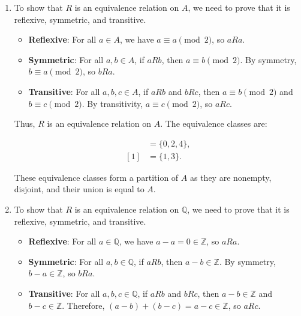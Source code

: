 \begin{enumerate}
\begin{align*}
[0] &= \{n \in \mathbb{Z} \mid n \equiv 0 \pmod 7\} = \{\dots, -7, 0, 7, 14, \dots\}, \\
[1] &= \{n \in \mathbb{Z} \mid n \equiv 1, 2, \text{ or } 4 \pmod 7\} = \{\dots, -6, -5, -3, 1, 2, 4, 8, 9, 11, \dots\}, \\
[3] &= \{n \in \mathbb{Z} \mid n \equiv 3, 5, \text{ or } 6 \pmod 7\} = \{\dots, -4, -2, -1, 3, 5, 6, 10, 12, 13, \dots\}.
\end{align*}

\item
To show that $R$ is an equivalence relation on $A$, we need to prove that it is reflexive, symmetric, and transitive.

\begin{itemize}
\item \textbf{Reflexive}: For all $a \in A$, we have $a \equiv a \pmod{2}$, so $aRa$.
\item \textbf{Symmetric}: For all $a, b \in A$, if $aRb$, then $a \equiv b \pmod{2}$. By symmetry, $b \equiv a \pmod{2}$, so $bRa$.
\item \textbf{Transitive}: For all $a, b, c \in A$, if $aRb$ and $bRc$, then $a \equiv b \pmod{2}$ and $b \equiv c \pmod{2}$. By transitivity, $a \equiv c \pmod{2}$, so $aRc$.
\end{itemize}

Thus, $R$ is an equivalence relation on $A$. The equivalence classes are:

\begin{align*}
[0] &= \{0, 2, 4\}, \\
[1] &= \{1, 3\}.
\end{align*}

These equivalence classes form a partition of $A$ as they are nonempty, disjoint, and their union is equal to $A$.

\item
To show that $R$ is an equivalence relation on $\mathbb{Q}$, we need to prove that it is reflexive, symmetric, and transitive.

\begin{itemize}
\item \textbf{Reflexive}: For all $a \in \mathbb{Q}$, we have $a - a = 0 \in \mathbb{Z}$, so $aRa$.
\item \textbf{Symmetric}: For all $a, b \in \mathbb{Q}$, if $aRb$, then $a - b \in \mathbb{Z}$. By symmetry, $b - a \in \mathbb{Z}$, so $bRa$.
\item \textbf{Transitive}: For all $a, b, c \in \mathbb{Q}$, if $aRb$ and $bRc$, then $a - b \in \mathbb{Z}$ and $b - c \in \mathbb{Z}$. Therefore, $(a - b) + (b - c) = a - c \in \mathbb{Z}$, so $aRc$.
\end{itemize}


\end{enumerate}
